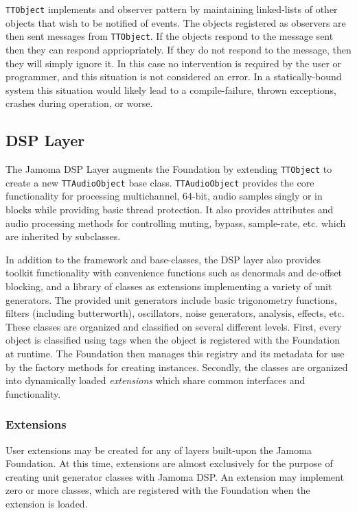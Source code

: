 \documentclass[twoside,10pt]{article}
\begin{document}
\texttt{\small{TTObject}} implements and observer pattern by maintaining linked-lists of other objects that wish to be notified of events.  The objects registered as observers are then sent messages from \texttt{\small{TTObject}}.  If the objects respond to the message sent then they can respond appriopriately.  If they do not respond to the message, then they will simply ignore it.  In this case no intervention is required by the user or programmer, and this situation is not considered an error.  In a statically-bound system this situation would likely lead to a compile-failure, thrown exceptions, crashes during operation, or worse.



\subsection{DSP Layer} %

The Jamoma DSP Layer \cite{web9} augments the Foundation by extending \texttt{\small{TTObject}} to create a new \texttt{\small{TTAudioObject}} base class.  \texttt{\small{TTAudioObject}} provides the core functionality for processing multichannel, 64-bit, audio samples singly or in blocks while providing basic thread protection.  It also provides attributes and audio processing methods for controlling muting, bypass, sample-rate, etc. which are inherited by subclasses.

In addition to the framework and base-classes, the DSP layer also provides toolkit functionality with convenience functions such as denormals and dc-offset blocking, and a library of classes as extensions implementing a variety of unit generators.  The provided unit generators include basic trigonometry functions, filters (including butterworth), oscillators, noise generators, analysis, effects, etc.  These classes are organized and classified on several different levels.  First, every object is classified using tags when the object is registered with the Foundation at runtime.  The Foundation then manages this registry and its metadata for use by the factory methods for creating instances.  Secondly, the classes are organized into dynamically loaded \emph{extensions} which share common interfaces and functionality.

\subsubsection{Extensions}

User extensions may be created for any of layers built-upon the Jamoma Foundation.  At this time, extensions are almost exclusively for the purpose of creating unit generator classes with Jamoma DSP. An extension may implement zero or more classes, which are registered with the Foundation when the extension is loaded.
\end{document}
